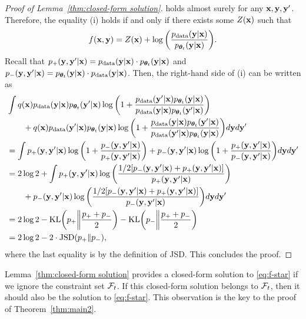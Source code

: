 \documentclass{article}
\begin{document}
\begin{proof}[Proof of Lemma~\ref{thm:closed-form solution}]
holds almost surely for any $\mathbf{x}, \mathbf{y}, \mathbf{y}'$. Therefore, the equality (i) holds if and only if there exists some $Z(\mathbf{x})$ such that 
\begin{align*}
f(\mathbf{x}, \mathbf{y}) = Z(\mathbf{x}) + \log\bigg(\frac{p_{\mathrm{data}}(\mathbf{y}|\mathbf{x})}{p_{\bm{\theta}_{t}}(\mathbf{y}|\mathbf{x})}\bigg).
\end{align*}
Recall that $p_{+}(\mathbf{y}, \mathbf{y}'|\mathbf{x}) = p_{\mathrm{data}}(\mathbf{y}|\mathbf{x})\cdot p_{\bm{\theta}_t}(\mathbf{y}|\mathbf{x})$ and $p_{-}(\mathbf{y}, \mathbf{y}'|\mathbf{x}) = p_{\bm{\theta}_t}(\mathbf{y}|\mathbf{x}) \cdot p_{\mathrm{data}}(\mathbf{y}|\mathbf{x})$. Then, the right-hand side of (i) can be written as 
\begin{align*}
&\int q(\mathbf{x})p_{\mathrm{data}}(\mathbf{y}|\mathbf{x})p_{\bm{\theta}_{t}}(\mathbf{y}'|\mathbf{x}) \log\bigg(1 + \frac{p_{\mathrm{data}}(\mathbf{y}'|\mathbf{x})p_{\bm{\theta}_{t}}(\mathbf{y}|\mathbf{x})}{p_{\mathrm{data}}(\mathbf{y}|\mathbf{x})p_{\bm{\theta}_{t}}(\mathbf{y}'|\mathbf{x}) }\bigg) 
 \notag\\
&\qquad + q(\mathbf{x})p_{\mathrm{data}}(\mathbf{y}'|\mathbf{x})p_{\bm{\theta}_{t}}(\mathbf{y}|\mathbf{x}) \log\bigg(1 + \frac{p_{\mathrm{data}}(\mathbf{y}|\mathbf{x})p_{\bm{\theta}_{t}}(\mathbf{y}'|\mathbf{x})}{p_{\mathrm{data}}(\mathbf{y}'|\mathbf{x})p_{\bm{\theta}_{t}}(\mathbf{y}|\mathbf{x})}\bigg)   
d\mathbf{y} d\mathbf{y}' \\
&= \int p_{+}(\mathbf{y}, \mathbf{y}'|\mathbf{x}) \log\bigg(1 + \frac{p_{-}(\mathbf{y}, \mathbf{y}'|\mathbf{x})}{p_{+}(\mathbf{y}, \mathbf{y}'|\mathbf{x})}\bigg) + p_{-}(\mathbf{y}, \mathbf{y}'|\mathbf{x}) \log\bigg(1 + \frac{p_{+}(\mathbf{y}, \mathbf{y}'|\mathbf{x})}{p_{-}(\mathbf{y}, \mathbf{y}'|\mathbf{x})}\bigg)   
d\mathbf{y} d\mathbf{y}' \\
&= 2\log2 + \int p_{+}(\mathbf{y}, \mathbf{y}'|\mathbf{x}) \log\bigg(\frac{1/2 [p_{-}(\mathbf{y}, \mathbf{y}'|\mathbf{x}) + p_{+}(\mathbf{y}, \mathbf{y}'|\mathbf{x})]}{p_{+}(\mathbf{y}, \mathbf{y}'|\mathbf{x})}\bigg) \\
&\qquad + p_{-}(\mathbf{y}, \mathbf{y}'|\mathbf{x}) \log\bigg(\frac{1/2 [p_{-}(\mathbf{y}, \mathbf{y}'|\mathbf{x}) + p_{+}(\mathbf{y}, \mathbf{y}'|\mathbf{x})]}{p_{-}(\mathbf{y}, \mathbf{y}'|\mathbf{x})}\bigg)   
d\mathbf{y} d\mathbf{y}' \\
&= 2\log2 - \mathrm{KL}\bigg(p_{+}\bigg\|\frac{p_{+} + p_{-}}{2}\bigg) - \mathrm{KL}\bigg(p_{-}\bigg\|\frac{p_{+} + p_{-}}{2}\bigg) \\
&= 2\log2 - 2 \cdot \mathrm{JSD}(p_{+}\|p_{-}),
\end{align*}
where the last equality is by the definition of JSD. This concludes the proof.
\end{proof}
Lemma~\ref{thm:closed-form solution} provides a closed-form solution to \eqref{eq:f-star} if we ignore the constraint set $\mathcal{F}_{t}$. If this closed-form solution belongs to $\mathcal{F}_{t}$, then it should also be the solution to \eqref{eq:f-star}. This observation is the key to the proof of Theorem~\ref{thm:main2}.
\end{document}
